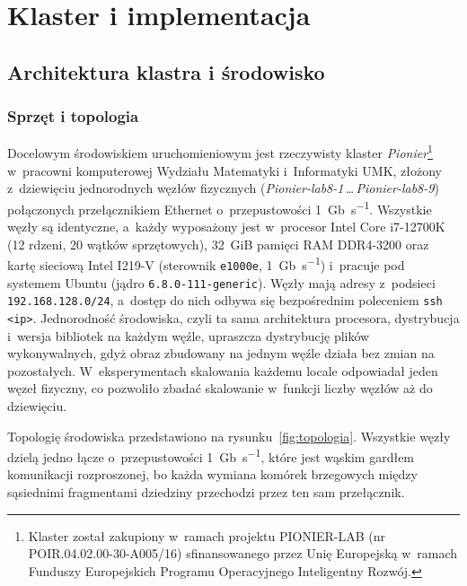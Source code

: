 \chapter{Klaster i implementacja}
\label{ch:implementacja}

\section{Architektura klastra i środowisko}
\label{sec:klaster}

\subsection{Sprzęt i topologia}

Docelowym środowiskiem uruchomieniowym jest rzeczywisty klaster \emph{Pionier}\footnote{Klaster został zakupiony w~ramach projektu PIONIER-LAB (nr POIR.04.02.00-30-A005/16) sfinansowanego przez Unię Europejską w~ramach Funduszy Europejskich Programu Operacyjnego Inteligentny Rozwój.} w~pracowni komputerowej Wydziału Matematyki i~Informatyki UMK, złożony z~dziewięciu jednorodnych węzłów fizycznych (\emph{Pionier-lab8-1}\,\dots\,\emph{Pionier-lab8-9}) połączonych przełącznikiem Ethernet o~przepustowości \SI{1}{Gb\per\second}. Wszystkie węzły są identyczne, a~każdy wyposażony jest w~procesor Intel Core i7-12700K (\num{12} rdzeni, \num{20} wątków sprzętowych), \SI{32}{GiB} pamięci RAM DDR4-3200 oraz kartę sieciową Intel I219-V (sterownik \texttt{e1000e}, \SI{1}{Gb\per\second}) i~pracuje pod systemem Ubuntu (jądro \texttt{6.8.0-111-generic}). Węzły mają adresy z~podsieci \texttt{192.168.128.0/24}, a~dostęp do nich odbywa się bezpośrednim poleceniem \texttt{ssh <ip>}. Jednorodność środowiska, czyli ta sama architektura procesora, dystrybucja i~wersja bibliotek na każdym węźle, upraszcza dystrybucję plików wykonywalnych, gdyż obraz zbudowany na jednym węźle działa bez zmian na pozostałych. W~eksperymentach skalowania każdemu locale odpowiadał jeden węzeł fizyczny, co pozwoliło zbadać skalowanie w~funkcji liczby węzłów aż do dziewięciu.

Topologię środowiska przedstawiono na rysunku~\ref{fig:topologia}. Wszystkie węzły dzielą jedno łącze o~przepustowości \SI{1}{Gb\per\second}, które jest wąskim gardłem komunikacji rozproszonej, bo każda wymiana komórek brzegowych między sąsiednimi fragmentami dziedziny przechodzi przez ten sam przełącznik.

